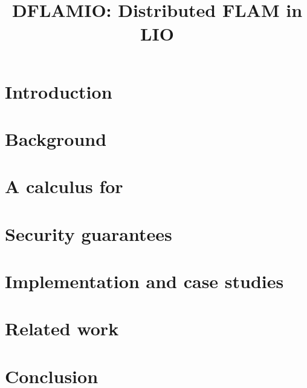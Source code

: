 \documentclass[conference]{IEEEtran}
\begin{document}
\title{DFLAMIO: Distributed FLAM in LIO}

\author{
}

\maketitle




\section{Introduction}


\section{Background}



\section{A calculus for \lang}\label{lab:calculus}



\section{Security guarantees}



\section{Implementation and case studies}



\section{Related work}



\section{Conclusion}






\vspace{12pt}

\appendix

\end{document}
